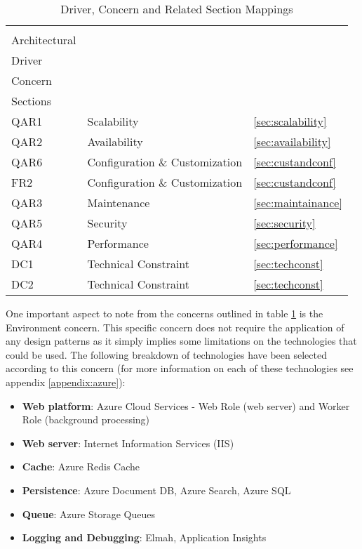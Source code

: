 \begin{table}[h]
\centering
\begin{tabularx}{\linewidth}{lXl}
\rowcolor[HTML]{EFEFEF} 
\begin{tabular}[c]{@{}l@{}}Candidat\\ Architectural\\ Driver\end{tabular} & \begin{tabular}[c]{@{}l@{}}Design\\ Concern\end{tabular} & \begin{tabular}[c]{@{}l@{}}Related\\ Sections\end{tabular} \\
QAR1 & Scalability & \ref{sec:scalability} \\
QAR2 & Availability & \ref{sec:availability} \\
QAR6 & Configuration \& Customization & \ref{sec:custandconf} \\
FR2 & Configuration \& Customization & \ref{sec:custandconf} \\
QAR3 & Maintenance & \ref{sec:maintainance} \\
QAR5 & Security & \ref{sec:security} \\
QAR4 & Performance & \ref{sec:performance} \\
DC1 & Technical Constraint & \ref{sec:techconst} \\
DC2 & Technical Constraint & \ref{sec:techconst} \\
\end{tabularx}
\caption{Driver, Concern and Related Section Mappings}
\label{table:designconcerns}
\end{table}

One important aspect to note from the concerns outlined in table \ref{table:designconcerns} is the Environment concern. This specific concern does not require the application of any design patterns as it simply implies some limitations on the technologies that could be used. The following breakdown of technologies have been selected according to this concern (for more information on each of these technologies see appendix \ref{appendix:azure}):
\begin{itemize}
\item \textbf{Web platform}: Azure Cloud Services - Web Role (web server) and Worker Role (background processing)
\item \textbf{Web server}: Internet Information Services (IIS)
\item \textbf{Cache}: Azure Redis Cache
\item \textbf{Persistence}: Azure Document DB, Azure Search, Azure SQL 
\item \textbf{Queue}: Azure Storage Queues
\item \textbf{Logging and Debugging}: Elmah, Application Insights
\end{itemize}

